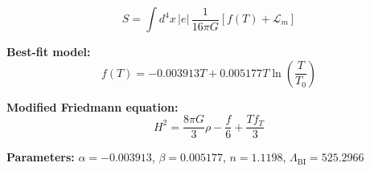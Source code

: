 
\begin{equation}
  S = \int d^4x \, |e| \, \frac{1}{16\pi G} \left[ f(T) + \mathcal{L}_m \right]
\end{equation}

\textbf{Best-fit model:}
\begin{equation}
  f(T) = -0.003913 T + 0.005177 T \ln\!\left(\frac{T}{T_0}\right)
\end{equation}

\textbf{Modified Friedmann equation:}
\begin{equation}
  H^2 = \frac{8\pi G}{3} \rho - \frac{f}{6} + \frac{T f_T}{3}
\end{equation}

\textbf{Parameters:}
$\alpha = -0.003913$, \quad
$\beta = 0.005177$, \quad
$n = 1.1198$, \quad
$\Lambda_{\text{BI}} = 525.2966$